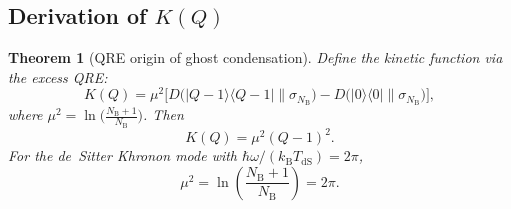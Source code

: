 \documentclass[letterpaper,twocolumn,superscriptaddress,longbibliography]{revtex4-2}
\newtheorem{theorem}{Theorem}[section]
\newcommand{\kB}{k_{\mathrm{B}}}
\newcommand{\ket}[1]{|#1\rangle}
\newcommand{\bra}[1]{\langle#1|}
\newcommand{\TdS}{T_{\mathrm{dS}}}
\newcommand{\NB}{N_{\mathrm{B}}}
\begin{document}
\subsection{Derivation of $K(Q)$}

\begin{theorem}[QRE origin of ghost condensation]
\label{thm:KQ}
Define the kinetic function via the \emph{excess QRE}:
\begin{equation}
  K(Q)
  = \mu^2 \bigl[
    D\bigl(\ket{Q-1}\!\bra{Q-1} \| \sigma_{\NB}\bigr)
    - D\bigl(\ket{0}\!\bra{0} \| \sigma_{\NB}\bigr)
    \bigr],
  \label{eq:K_QRE_def}
\end{equation}
where $\mu^2 = \ln\bigl(\frac{\NB+1}{\NB}\bigr)$.
Then
\begin{equation}
  K(Q) = \mu^2 (Q - 1)^2.
  \label{eq:K_result}
\end{equation}
For the de~Sitter Khronon mode with $\hbar\omega/(\kB\TdS) = 2\pi$,
\begin{equation}
  \mu^2 = \ln\!\left(\frac{\NB+1}{\NB}\right) = 2\pi.
  \label{eq:mu_value}
\end{equation}
\end{theorem}
\end{document}
